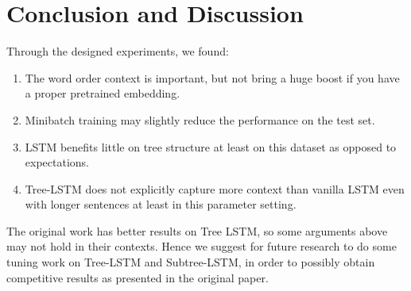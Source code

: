 \section{Conclusion and Discussion}
\label{sec: conclusion}
Through the designed experiments, we found:
\begin{enumerate}
    \vspace{-5pt}
    \item The word order context is important, but not bring a huge boost if you
    have a proper pretrained embedding.
    \vspace{-7pt}
    \item Minibatch training may slightly reduce the performance on the test
    set.
    \vspace{-7pt}
    \item LSTM benefits little on tree structure at least on this dataset as
    opposed to expectations.
    \vspace{-7pt}
    \item Tree-LSTM does not explicitly capture more context than vanilla LSTM
    even with longer sentences at least in this parameter setting.
\end{enumerate}
The original work\cite{tai2015improved} has better results on Tree LSTM, so some
arguments above may not hold in their contexts. Hence we suggest for future
research to do some tuning work on Tree-LSTM and Subtree-LSTM, in order to
possibly obtain competitive results as presented in the original paper.